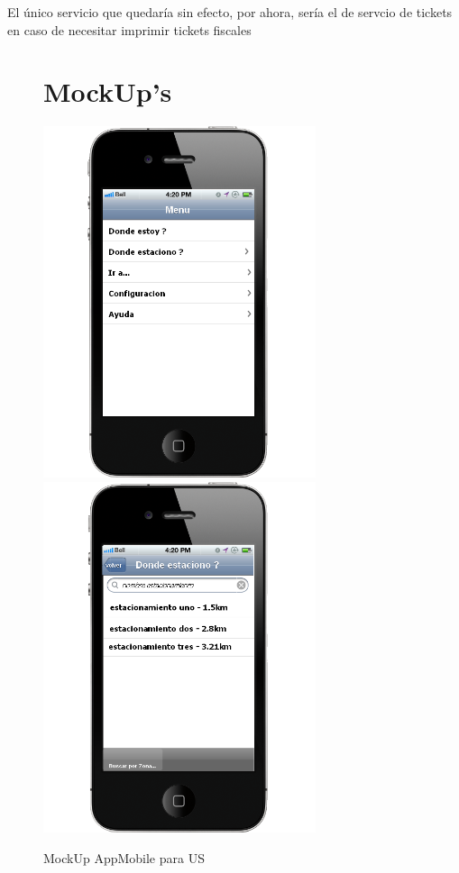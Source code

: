\documentclass[spanish, DIV=calc, paper=a4, fontsize=11pt, twocolumn]{scrartcl}	 %
\begin{document}
El único servicio que quedaría sin efecto, por ahora, sería el de servcio de tickets en caso de necesitar imprimir tickets fiscales


\begin{figure}[htp]
\section{MockUp's}
\includegraphics[width=8.0cm,height=\paperheight,keepaspectratio]{img/mockUpAppMobileUS/home.png}%
\includegraphics[width=8.0cm,height=\paperheight,keepaspectratio]{img/mockUpAppMobileUS/donde_estaciono_.png}%
\caption{MockUp AppMobile para US}
\label{dash-1}
\end{figure}
\end{document}
